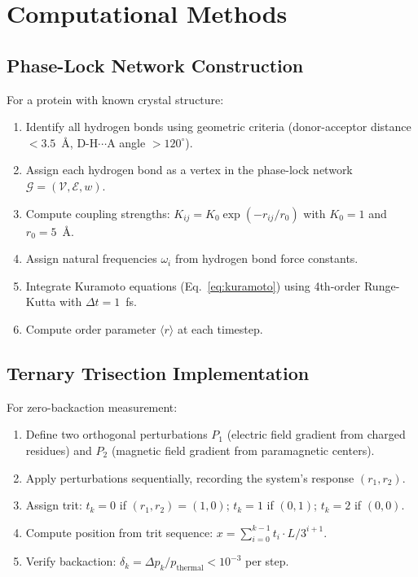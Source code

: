 \documentclass[aps,prx,superscriptaddress,twocolumn,10pt,a4paper,longbibliography,preprint]{revtex4-2}
\newcommand{\calG}{\mathcal{G}}
\newcommand{\calV}{\mathcal{V}}
\newcommand{\calE}{\mathcal{E}}
\newcommand{\orderp}{\langle r \rangle}
\theoremstyle{definition}
\theoremstyle{remark}
\begin{document}
\section{Computational Methods}
\label{app:methods}

\subsection{Phase-Lock Network Construction}

For a protein with known crystal structure:
\begin{enumerate}
\item Identify all hydrogen bonds using geometric criteria (donor-acceptor distance $< 3.5$~\AA, D-H$\cdots$A angle $> 120^\circ$).
\item Assign each hydrogen bond as a vertex in the phase-lock network $\calG = (\calV, \calE, w)$.
\item Compute coupling strengths: $K_{ij} = K_0 \exp(-r_{ij}/r_0)$ with $K_0 = 1$ and $r_0 = 5$~\AA.
\item Assign natural frequencies $\omega_i$ from hydrogen bond force constants.
\item Integrate Kuramoto equations (Eq.~\ref{eq:kuramoto}) using 4th-order Runge-Kutta with $\Delta t = 1$~fs.
\item Compute order parameter $\orderp$ at each timestep.
\end{enumerate}

\subsection{Ternary Trisection Implementation}

For zero-backaction measurement:
\begin{enumerate}
\item Define two orthogonal perturbations $P_1$ (electric field gradient from charged residues) and $P_2$ (magnetic field gradient from paramagnetic centers).
\item Apply perturbations sequentially, recording the system's response $(r_1, r_2)$.
\item Assign trit: $t_k = 0$ if $(r_1, r_2) = (1, 0)$; $t_k = 1$ if $(0, 1)$; $t_k = 2$ if $(0, 0)$.
\item Compute position from trit sequence: $x = \sum_{i=0}^{k-1} t_i \cdot L/3^{i+1}$.
\item Verify backaction: $\delta_k = \Delta p_k / p_{\text{thermal}} < 10^{-3}$ per step.
\end{enumerate}
\end{document}
